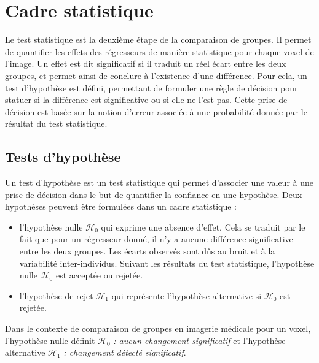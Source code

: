\section{Cadre statistique}
Le test statistique est la deuxième étape de la comparaison de groupes.
Il permet de quantifier les effets des régresseurs de manière statistique pour chaque voxel de l'image.
Un effet est dit significatif si il traduit un réel écart entre les deux groupes, et permet ainsi de conclure à l'existence d'une différence.
Pour cela, un test d'hypothèse est défini, permettant de formuler une règle de décision pour statuer si la différence est significative ou si elle ne l'est pas.
Cette prise de décision est basée sur la notion d'erreur associée à une probabilité donnée par le résultat du test statistique.

\subsection{Tests d'hypothèse}
Un test d'hypothèse est un test statistique qui permet d'associer une valeur à une prise de décision dans le but de quantifier la confiance en une hypothèse.
Deux hypothèses peuvent être formulées dans un cadre statistique :\\
\begin{itemize}
    \item l'hypothèse nulle $\mathcal{H}_{0}$ qui exprime une absence d'effet. 
    Cela se traduit par le fait que pour un régresseur donné, il n'y a aucune différence significative entre les deux groupes. 
    Les écarts observés sont dûs au bruit et à la variabilité inter-individus.
    Suivant les résultats du test statistique, l'hypothèse nulle $\mathcal{H}_{0}$ est acceptée ou rejetée.\\
    \item l'hypothèse de rejet $\mathcal{H}_{1}$ qui représente l'hypothèse alternative si $\mathcal{H}_{0}$ est rejetée.\\
\end{itemize}

Dans le contexte de comparaison de groupes en imagerie médicale pour un voxel, l'hypothèse nulle définit $\mathcal{H}_{0}$\textit{ : aucun changement significatif}
et l'hypothèse alternative $\mathcal{H}_{1}$\textit{ : changement détecté significatif}.


